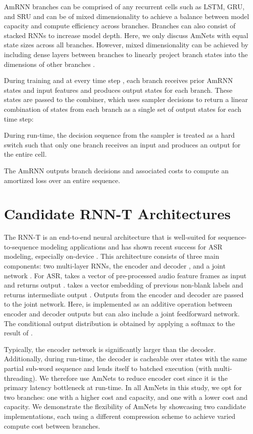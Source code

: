 \documentclass[a4paper]{article}
\begin{document}
AmRNN branches can be comprised of any recurrent cells such as LSTM, GRU, and SRU and can be of mixed dimensionality to achieve a balance between model capacity and compute efficiency across branches. 
Branches can also consist of stacked RNNs to increase model depth. 
Here, we only discuss AmNets with equal state sizes across all branches. 
However, mixed dimensionality can be achieved by including dense layers between branches to linearly project branch states into the dimensions of other branches \cite{Macoskey21}.

During training and at every time step , each branch receives prior AmRNN states  and input features  and produces output states  for each branch. These states are passed to the combiner, which uses sampler decisions  to return a linear combination of states from each branch as a single set of output states  for each time step:
\noindent

\noindent 
During run-time, the decision sequence from the sampler is treated as a hard switch such that only one branch receives an input and produces an output for the entire cell.

The AmRNN outputs branch decisions and associated costs to compute an amortized loss  over an entire sequence.

\section{Candidate RNN-T Architectures}
\label{sec:candidates}
The RNN-T is an end-to-end neural architecture that is well-suited for sequence-to-sequence modeling applications and has shown recent success for ASR modeling, especially on-device \cite{He2019}.
This architecture consists of three main components: two multi-layer RNNs, the encoder  and decoder , and a joint network .
For ASR,  takes a vector of pre-processed audio feature frames  as input and returns output . 
 takes a vector embedding of previous non-blank labels  and returns intermediate output .
Outputs from the encoder and decoder are passed to the joint network.
Here,  is implemented as an additive operation between encoder and decoder outputs but can also include a joint feedforward network.
The conditional output distribution  is obtained by applying a softmax to the result of . 

Typically, the encoder network is significantly larger than the decoder.
Additionally, during run-time, the decoder is cacheable over states with the same partial sub-word sequence and lends itself to batched execution (with multi-threading).
We therefore use AmNets to reduce encoder cost since it is the primary latency bottleneck at run-time. 
In all AmNets in this study, we opt for two branches: one with a higher cost and capacity, and one with a lower cost and capacity. We demonstrate the flexibility of AmNets by showcasing two candidate implementations, each using a different compression scheme to achieve varied compute cost between branches.
\end{document}
